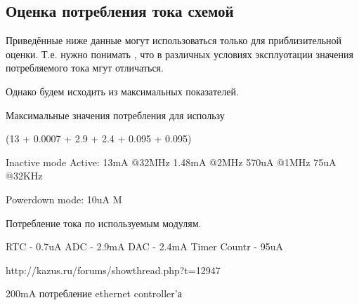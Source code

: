 \subsection{Оценка потребления тока схемой}

Приведённые ниже данные могут использоваться только для приблизительной оценки.
Т.е. нужно понимать , что в различных условиях эксплуотации значения потребляемого
тока мгут отличаться.

Однако будем исходить из максимальных показателей.

Максимальные значения потребления для использу


(13 + 0.0007 + 2.9 + 2.4 + 0.095 + 0.095)

Inactive mode Active:
    13mA @32MHz
    1.48mA @2MHz
    570uA @1MHz
    75uA @32KHz

Powerdown mode:
    10uA M


Потребление тока по используемым модулям.

RTC - 0.7uA
ADC - 2.9mA
DAC - 2.4mA
Timer Countr - 95uA


http://kazus.ru/forums/showthread.php?t=12947

200mA потребление ethernet controller'а


